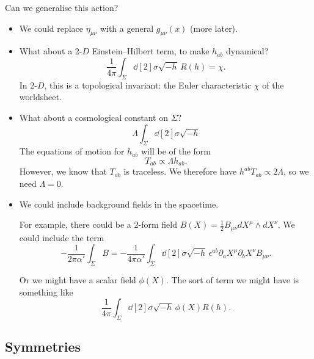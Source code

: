 Can we generalise this action?
\begin{itemize}
  \item We could replace $\eta_{\mu\nu}$ with a general $g_{\mu\nu}(x)$ (more later).
  \item What about a 2-$D$ Einstein--Hilbert term, to make $h_{ab}$  dynamical?
    \begin{equation}
      \frac{1}{4 \pi} \int_\Sigma \dd[2]{\sigma} \sqrt{-h} \, R(h) = \chi.
    \end{equation}
    In 2-$D$, this is a topological invariant: the Euler characteristic $\chi$ of the worldsheet.
  \item What about a cosmological constant on $\Sigma$?
    \begin{equation}
      \Lambda \int_\Sigma \dd[2]{\sigma} \sqrt{-h}
    \end{equation}
    The equations of motion for $h_{ab}$ will be of the form
    \begin{equation}
      T_{ab} \propto \Lambda h_{ab}.
    \end{equation}
    However, we know that $T_{ab}$ is traceless. We therefore have $h^{ab} T_{ab} \propto 2 \Lambda$, so we need $\Lambda = 0$.
  \item We could include background fields in the spacetime. 

    For example, there could be a $2$-form field $ B(X) = \frac{1}{2} B_{\mu\nu} dX^{\mu} \wedge dX^{\nu}$.
    We could include the term
    \begin{equation}
      -\frac{1}{2\pi \alpha'} \int_\Sigma B = -\frac{1}{4 \pi \alpha'} \int_\Sigma \dd[2]{\sigma} \sqrt{-h} \, \epsilon^{ab} \partial_{a} X^{\mu} \partial_{b} X^{\nu} B_{\mu\nu}.
    \end{equation}

    Or we might have a scalar field $\phi(X)$. The sort of term we might have is something like
    \begin{equation}
      \frac{1}{4 \pi } \int_\Sigma \dd[2]{\sigma} \sqrt{-h} \, \phi(X) R(h).
    \end{equation}
\end{itemize}

\subsection{Symmetries}%
\label{sub:symmetries}

